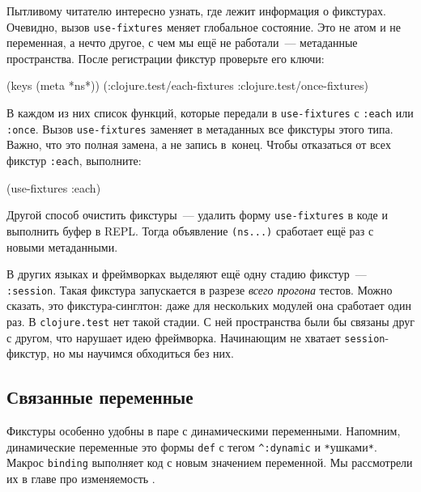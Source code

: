 Пытливому читателю интересно узнать, где лежит информация о фикстурах. Очевидно,
вызов \verb|use-fixtures| меняет глобальное состояние. Это не атом и не
переменная, а нечто другое, с чем мы ещё не работали~--- метаданные
пространства. После регистрации фикстур проверьте его ключи:


\begin{english}
  \begin{clojure}
(keys (meta *ns*))
(:clojure.test/each-fixtures :clojure.test/once-fixtures)
  \end{clojure}
\end{english}

В каждом из них список функций, которые передали в \verb|use-fixtures| с
\verb|:each| или \verb|:once|. Вызов \verb|use-fixtures| заменяет в метаданных
все фикстуры этого типа. Важно, что это полная замена, а не запись
в~конец. Чтобы отказаться от всех фикстур \verb|:each|, выполните:

\begin{english}
  \begin{clojure}
(use-fixtures :each)
  \end{clojure}
\end{english}

Другой способ очистить фикстуры~--- удалить форму \verb|use-fixtures| в коде и
выполнить буфер в REPL. Тогда объявление \verb|(ns...)| сработает ещё раз с
новыми метаданными.

В других языках и фреймворках выделяют ещё одну стадию фикстур~---
\verb|:session|. Такая фикстура запускается в разрезе \emph{всего прогона}
тестов. Можно сказать, это фикстура-синглтон: даже для нескольких модулей она
сработает один раз. В \verb|clojure.test| нет такой стадии. С ней пространства
были бы связаны друг с другом, что нарушает идею фреймворка. Начинающим не
хватает \verb|session|-фикстур, но мы научимся обходиться без них.

\subsection{Связанные переменные}


Фикстуры особенно удобны в паре с динамическими переменными. Напомним,
динамические переменные это формы \verb|def| с тегом \verb|^:dynamic| и
\verb|*|ушками\verb|*|. Макрос \verb|binding| выполняет код с новым
значением переменной. Мы рассмотрели их в главе про
изменяемость .

